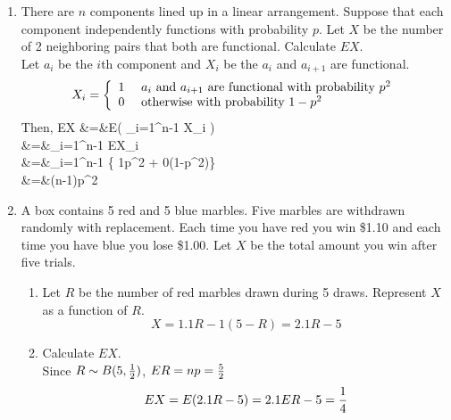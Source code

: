\documentclass[12pt]{article}%
\newcommand{\0}{{\bf 0}}
\begin{document}
\begin{enumerate}
\item
There are $n$ components lined up in a linear arrangement. 
Suppose that each component independently functions with probability $p$. 
Let $X$ be the number of 2 neighboring pairs that both are functional. 
Calculate $EX$. 
\\
{\color{blue}{\bf Sol.}}
Let $a_i$ be the $i$th component and $X_i$ be the $a_i$ and $a_{i+1}$ are functional. 
$$
X_i=\left\{\ba{ll}
1 &\ a_i\ \mb{and} \ a_{i+1}\ \mb{are functional with probability}\ p^2 \\
0 &\ \mb{otherwise with probability}\ 1-p^2 \
\ea\right.
$$
Then,
\bea
EX
&=&E( \sum_{i=1}^{n-1} X_i )\nn\\
&=&\sum_{i=1}^{n-1} EX_i \nn\\
&=&\sum_{i=1}^{n-1} \{ 1\cdot p^2 + 0\cdot(1-p^2)\} \nn\\
&=&(n-1)p^2 \nn
\eea


\item %
A box contains 5 red and 5 blue marbles. 
Five marbles are withdrawn randomly with replacement. 
Each time you have red you win \$1.10 and
each time you have blue you  lose \$1.00. 
Let $X$ be the total amount you win after five trials.
\begin{enumerate}
\item
Let $R$ be the number of red marbles drawn during 5 draws.
Represent $X$ as a function of $R$.  
\\
{\color{blue}{\bf Sol.}}
$$X=1.1R-1(5-R)=2.1R-5$$
\item
Calculate  $EX$. 
\\
{\color{blue}{\bf Sol.}}
Since $R \sim B(5,\frac{1}{2})$, $ER=np=\frac{5}{2}$ 
$$EX=E(2.1R-5)=2.1ER-5=\frac{1}{4}$$

\end{enumerate}




\end{enumerate}
\end{document}
